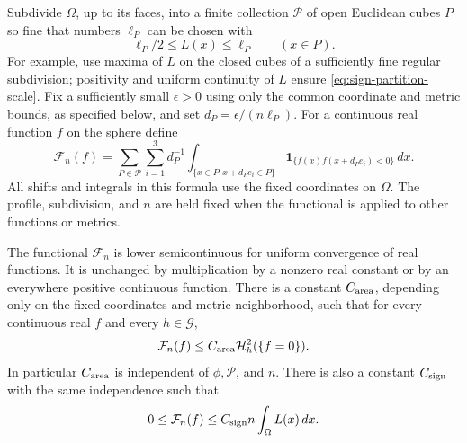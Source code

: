 Subdivide $\Omega$, up to its faces, into a finite collection
$\mathscr P$ of open Euclidean cubes $P$ so fine that numbers $\ell_P$
can be chosen with
\begin{equation}
 \ell_P/2\le L(x)\le\ell_P\qquad(x\in P).
 \label{eq:sign-partition-scale}
\end{equation}
For example, use maxima of $L$ on the closed cubes of a sufficiently
fine regular subdivision; positivity and uniform continuity of $L$
ensure \eqref{eq:sign-partition-scale}.  Fix a sufficiently
small $\epsilon>0$ using only the common coordinate and metric
bounds, as specified below, and set $d_P=\epsilon/(n\ell_P)$.
For a continuous real function $f$ on the sphere define
\begin{equation}
 \mathcal F_n(f)=
 \sum_{P\in\mathscr P}\sum_{i=1}^3d_P^{-1}
 \int_{\{x\in P:x+d_Pe_i\in P\}}
       \mathbf1_{\{f(x)f(x+d_Pe_i)<0\}}\,dx.
 \label{eq:sign-functional}
\end{equation}
All shifts and integrals in this formula use the fixed coordinates
on $\Omega$.  The profile, subdivision, and $n$ are held fixed when
the functional is applied to other functions or metrics.

\begin{proposition}
\label{prop:sign-functional}
\label{lem:sign-area}
The functional $\mathcal F_n$ is lower semicontinuous for uniform
convergence of real functions.  It is unchanged by multiplication
by a nonzero real constant or by an everywhere positive continuous
function.  There is a constant $C_{\rm area}$, depending only on the
fixed coordinates and metric neighborhood, such that for every
continuous real $f$ and every $h\in\mathcal G$,
\begin{equation}
 \mathcal F_n(f)\le
       C_{\rm area}\mathcal H_h^2(\{f=0\}).
 \label{eq:sign-area-bound}
\end{equation}
In particular $C_{\rm area}$ is independent of $\phi,\mathscr P$, and
$n$.  There is also a constant $C_{\rm sign}$ with the same
independence such that
\begin{equation}
 0\le\mathcal F_n(f)\le
       C_{\rm sign}n\int_\Omega L(x)\,dx.
 \label{eq:sign-deterministic-upper}
\end{equation}
\end{proposition}


